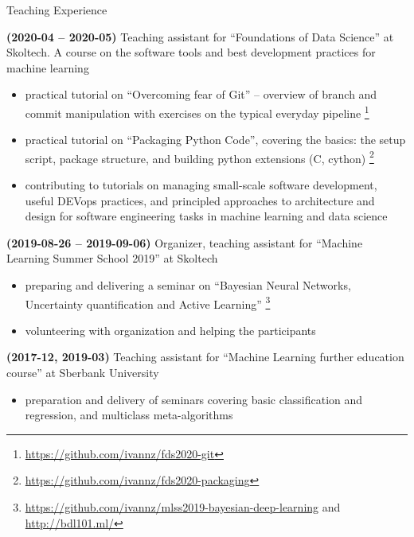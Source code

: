 \documentclass{resume} %
\begin{document}
\begin{rSection}{Teaching Experience}
    \item \textbf{(2020-04 -- 2020-05)}
    Teaching assistant for ``Foundations of Data Science'' at Skoltech. A course on the software tools and best development practices for machine learning
    \begin{itemize}
        \item practical tutorial on ``Overcoming fear of Git'' -- overview of branch and commit manipulation with exercises on the typical everyday pipeline%
        \footnote{
            \url{https://github.com/ivannz/fds2020-git}
        }

        \item practical tutorial on ``Packaging Python Code'', covering the basics: the setup script, package structure, and building python extensions (C, cython)%
        \footnote{
            \url{https://github.com/ivannz/fds2020-packaging}
        }

        \item contributing to tutorials on managing small-scale software development, useful DEVops practices, and principled approaches to architecture and design for software engineering tasks in machine learning and data science
    \end{itemize}

    \item \textbf{(2019-08-26 -- 2019-09-06)}
    Organizer, teaching assistant for ``Machine Learning Summer School 2019'' at Skoltech
    \begin{itemize}
        \item preparing and delivering a seminar on ``Bayesian Neural Networks, Uncertainty quantification and Active Learning''%
        \footnote{
            \url{https://github.com/ivannz/mlss2019-bayesian-deep-learning}
            and \url{http://bdl101.ml/}
        }

        \item volunteering with organization and helping the participants
    \end{itemize}

    \item \textbf{(2017-12, 2019-03)}  %
    Teaching assistant for ``Machine Learning further education course'' at Sberbank University
    \begin{itemize}
        \item preparation and delivery of seminars covering basic classification and regression, and multiclass meta-algorithms
    \end{itemize}


\end{rSection}
\end{document}
